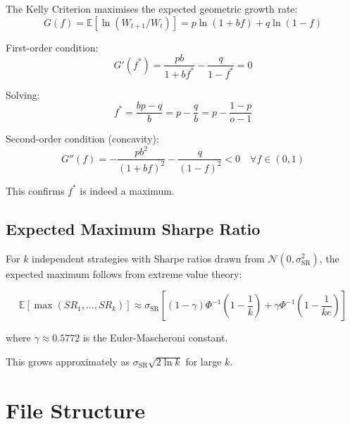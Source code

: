 \documentclass[12pt,a4paper]{report}
\theoremstyle{definition}
\newcommand{\E}{\mathbb{E}}
\begin{document}
The Kelly Criterion maximises the expected geometric growth rate:
\begin{equation}
    G(f) = \E[\ln(W_{t+1}/W_t)] = p\ln(1+bf) + q\ln(1-f)
\end{equation}

First-order condition:
\begin{equation}
    G'(f^*) = \frac{pb}{1+bf^*} - \frac{q}{1-f^*} = 0
\end{equation}

Solving:
\begin{equation}
    f^* = \frac{bp - q}{b} = p - \frac{q}{b} = p - \frac{1-p}{o-1}
\end{equation}

Second-order condition (concavity):
\begin{equation}
    G''(f) = -\frac{pb^2}{(1+bf)^2} - \frac{q}{(1-f)^2} < 0 \quad \forall f \in (0,1)
\end{equation}

This confirms $f^*$ is indeed a maximum.

\section{Expected Maximum Sharpe Ratio}

For $k$ independent strategies with Sharpe ratios drawn from $\mathcal{N}(0, \sigma_{\text{SR}}^2)$, the expected maximum follows from extreme value theory:

\begin{equation}
    \E[\max(SR_1, \ldots, SR_k)] \approx \sigma_{\text{SR}}\left[(1-\gamma)\Phi^{-1}\!\left(1-\frac{1}{k}\right) + \gamma\Phi^{-1}\!\left(1-\frac{1}{ke}\right)\right]
\end{equation}

where $\gamma \approx 0.5772$ is the Euler-Mascheroni constant.

This grows approximately as $\sigma_{\text{SR}} \sqrt{2\ln k}$ for large $k$.

\chapter{File Structure}
\label{app:file-structure}
\end{document}
